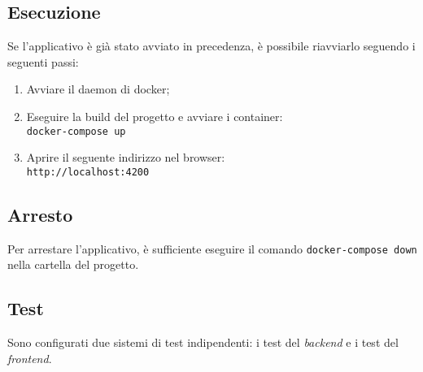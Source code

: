 \subsection{Esecuzione}
Se l'applicativo è già stato avviato in precedenza, è possibile riavviarlo
seguendo i seguenti passi:
\begin{enumerate}
	\item Avviare il daemon di docker;
	\item Eseguire la build del progetto e avviare i container: \\
		\texttt{docker-compose up}
	\item Aprire il seguente indirizzo nel browser: \\
		\texttt{http://localhost:4200}
\end{enumerate}


\subsection{Arresto}
Per arrestare l'applicativo, è sufficiente eseguire il comando
\texttt{docker-compose down} nella cartella del progetto.


\subsection{Test}
Sono configurati due sistemi di test indipendenti: i test del \textit{backend} e
i test del \textit{frontend}.

